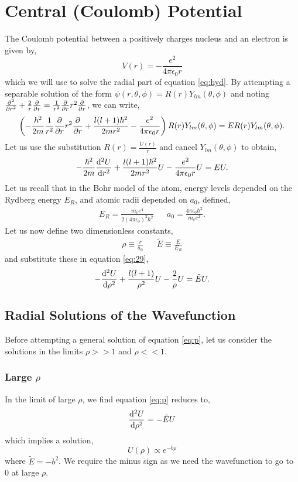 \documentclass{book}
\begin{document}
\section{Central (Coulomb) Potential}
The Coulomb potential between a positively charges nucleus and an electron is given by,
\begin{equation}
	V(r) = -\frac{e^2}{4\pi\epsilon_0r}
\end{equation}
which we will use to solve the radial part of equation \eqref{eq:hyd}. By attempting a separable solution of the form $\psi(r, \theta,\phi) = R(r)Y_{lm}(\theta,\phi)$ and noting $\pdv[2]{r} + \frac{2}{r}\pdv{r} = \frac{1}{r^2}\pdv{r}r^2\pdv{r}$, we can write,
\begin{equation}
	\left(-\frac{\hbar^2}{2m}\frac{1}{r^2}\pdv{r}r^2\pdv{r} + \frac{l(l+1)\hbar^2}{2mr^2} -\frac{e^2}{4\pi\epsilon_0r}\right)R(r)Y_{lm}(\theta,\phi) = ER(r)Y_{lm}(\theta,\phi).
\end{equation}
Let us use the substitution $R(r) = \frac{U(r)}{r}$ and cancel $Y_{lm}(\theta,\phi)$ to obtain,
\begin{equation}
	-\frac{\hbar^2}{2m}\dv[2]{U}{r} + \frac{l(l+1)\hbar^2}{2mr^2}U - \frac{e^2}{4\pi\epsilon_0r}U = EU. \label{eq:29}
\end{equation}
Let us recall that in the Bohr model of the atom, energy levels depended on the Rydberg energy $E_R$, and atomic radii depended on $a_0$, defined,
\begin{align}
	E_R = \frac{m_ee^4}{2(4\pi\epsilon_0)^2\hbar^2} && a_0 = \frac{4\pi\epsilon_0\hbar^2}{m_ee^2}.
\end{align}
Let us now define two dimensionless constants,
\begin{align}
	\rho \equiv \frac{r}{a_0} && \tilde{E} \equiv \frac{E}{E_R}
\end{align}
and substitute these in equation \eqref{eq:29},
\begin{equation}
	-\dv[2]{U}{\rho} + \frac{l(l+1)}{\rho^2}U - \frac{2}{\rho}U = \tilde{E}U. \label{eq:p}
\end{equation}
\subsection{Radial Solutions of the Wavefunction}
Before attempting a general solution of equation \eqref{eq:p}, let us consider the solutions in the limits $\rho >>1$ and $\rho << 1$. 
\subsubsection{Large $\rho$}
In the limit of large $\rho$, we find equation \eqref{eq:p} reduces to,
\begin{equation}
	\dv[2]{U}{\rho} = - \tilde{E}U
\end{equation}
which implies a solution,
\begin{equation}
	U(\rho) \propto e^{-b\rho}
\end{equation}
where $\tilde{E} = -b^2$. We require the minus sign as we need the wavefunction to go to 0 at large $\rho$.
\end{document}
